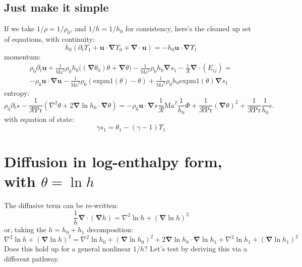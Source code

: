 \documentclass{aastex631}
\newcommand{\del}{\nabla}
\renewcommand{\vec}{\boldsymbol}
\newcommand{\grad}{\vec{\del}}
\newcommand{\scrR}{\mathcal{R}}
\newcommand{\Ma}{\mathrm{Ma}}
\renewcommand{\Pr}{\mathrm{Pr}}
\newcommand{\expm}{\mathrm{expm1}}
\begin{document}
\subsection{Just make it simple}
If we take $1/\rho = 1/\rho_0$, and $1/h = 1/h_0$ for consistency, here's the cleaned up set of equations, with continuity:
\begin{equation}
    h_0 \left(\partial_t \Upsilon_1 + \vec{u}\cdot\grad \Upsilon_0 + \grad \cdot \vec{u}\right) = - h_0 \vec{u}\cdot\grad \Upsilon_1
\end{equation}
momentum:
\begin{multline}
  \rho_0 \partial_t \vec{u}
  + \frac{1}{\Ma^2}\rho_0 h_0 \Bigg((\grad \theta_0)\theta  + \grad \theta \Bigg)
  - \frac{1}{\Ma^2} \rho_0 h_0 \grad s_1
  - \frac{1}{\scrR}\grad \cdot (E_{ij})
  = \\
  -\rho_0 \vec{u}\cdot\grad\vec{u}
  -\frac{1}{\Ma^2} \rho_0 \left(\expm(\theta)-\theta\right)
  + \frac{1}{\Ma^2} \rho_0 h_0 \expm(\theta) \grad s_1
\end{multline}
entropy:
\begin{equation}
  \rho_0 \partial_t s
  - \frac{1}{\scrR \Pr}\left(\nabla^2 \theta + 2 \grad \ln h_0 \cdot \grad \theta \right)
  =
  - \rho_0 \vec{u}\cdot\grad s
  \frac{1}{\scrR} \Ma^2  \frac{1}{h_0} \Phi
  + \frac{1}{\scrR \Pr} (\grad \theta)^2
  + \frac{1}{\scrR \Pr} \frac{1}{h_0} \epsilon.
\end{equation}
with equation of state:
\begin{equation}
  \gamma s_1 = \theta_1 - (\gamma - 1)\Upsilon_1
\end{equation}


\newpage
\appendix
\section{Diffusion in log-enthalpy form, with $\theta = \ln h$}
\label{sec:log enthalpy diffusion}
The diffusive term can be re-written:
\begin{equation}
  \frac{1}{h}\grad\cdot(\grad h) = \nabla^2 \ln h + (\grad \ln h)^2
\end{equation}
or, taking the $h = h_0 + h_1$ decomposition:
\begin{equation}
  \nabla^2 \ln h + (\grad \ln h)^2 = \nabla^2 \ln h_0 + (\grad \ln h_0)^2 + 2\grad \ln h_0 \cdot \grad \ln h_1 + \nabla^2 \ln h_1 + (\grad \ln h_1)^2
\end{equation}
Does this hold up for a general nonlinear $1/h$?  Let's test by deriving this via a different pathway.
\end{document}
